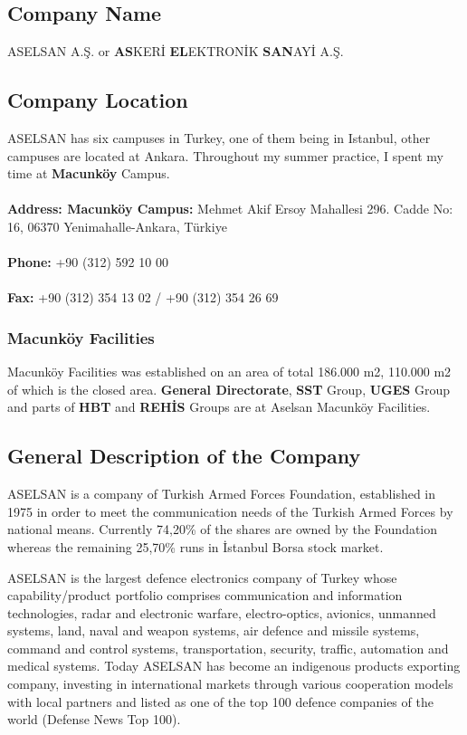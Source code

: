\subsection{Company Name}
\-
\indent ASELSAN A.Ş. or \textbf{AS}KERİ \textbf{EL}EKTRONİK \textbf{SAN}AYİ A.Ş.


\subsection{Company Location}
\-\indent
	ASELSAN has six campuses in Turkey, one of them being in Istanbul, other campuses are located at Ankara. Throughout my summer practice, I spent my time at \textbf{Macunköy} Campus. 
\\
\\
\textbf{ Address: Macunköy Campus:} Mehmet Akif Ersoy Mahallesi 296. Cadde No: 16, 06370 Yenimahalle-Ankara, Türkiye
\\
\\
\textbf{ Phone:} +90 (312) 592 10 00
\\
\\
\textbf{ Fax:} +90 (312) 354 13 02 / +90 (312) 354 26 69


\subsubsection{Macunköy Facilities}
\- \indent

	Macunköy Facilities was established on an area of total 186.000 m2, 110.000 m2 of which is the closed area. \textbf{General Directorate}, \textbf{SST} Group, \textbf{UGES} Group and parts of \textbf{HBT} and \textbf{REHİS} Groups are at Aselsan Macunköy Facilities.
\vfill

\subsection{General Description of the Company}
\-
\indent ASELSAN is a company of Turkish Armed Forces Foundation, established in 1975 in order to meet the communication needs of the Turkish Armed Forces by national means. Currently 74,20\% of the shares are owned by the Foundation whereas the remaining 25,70\% runs in İstanbul Borsa stock market.

	ASELSAN is the largest defence electronics company of Turkey whose capability/product portfolio comprises communication and information technologies, radar and electronic warfare, electro-optics, avionics, unmanned systems, land, naval and weapon systems, air defence and missile systems, command and control systems, transportation, security, traffic, automation and medical systems. Today ASELSAN has become an indigenous products exporting company, investing in international markets through various cooperation models with local partners and listed as one of the top 100 defence companies of the world (Defense News Top 100).

